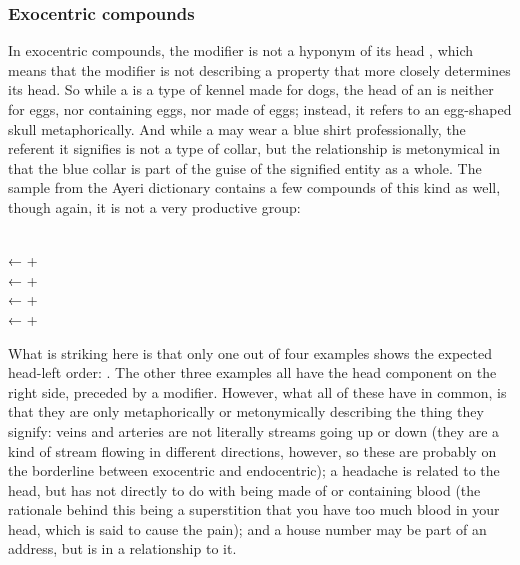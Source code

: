 
\subsubsection{Exocentric compounds}

In exocentric compounds, the modifier is not a hyponym of its head
\citep[700]{bauer2001}, which means that the modifier is not describing a
property that more closely determines its head. So while a  is a
type of kennel made for dogs, the head of an  is neither for eggs,
nor containing eggs, nor made of eggs; instead, it refers to an egg-shaped
skull metaphorically. And while a  may wear a blue shirt
professionally, the referent it signifies is not a type of collar, but the
relationship is metonymical in that the blue collar is part of the guise of the
signified entity as a whole. The sample from the Ayeri dictionary contains a
few compounds of this kind as well, though again, it is not a very productive
group:

\pex
	\a {} \\
		← 
		+ 
	\a {} \\
		← 
		+ 
	\a {} \\
		← 
		+ 
	\a {} \\
		← 
		+ 
	\xe

What is striking here is that only one out of four examples shows the expected 
head-left order: . The other three examples all have
the head component on the right side, preceded by a modifier. However, 
what all of these have in common, is that they are only metaphorically or 
metonymically describing the thing they signify: veins and arteries are not 
literally streams going up or down (they are a kind of stream flowing in 
different directions, however, so these are probably on the borderline between 
exocentric and endocentric); a headache is related to the head, but has not 
directly to do with being made of or containing blood (the rationale 
behind this being a superstition that you have too much blood in your head, 
which is said to cause the pain); and a house number may be part of an 
address, but is in a  relationship to it.

